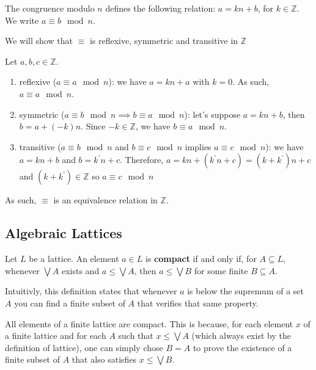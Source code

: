 \begin{example} The congruence modulo $n$ defines the following relation: $a =
  kn +b$, for $k \in \mathbb{Z}$. We write $a \equiv b \mod n$.

  We will show that $\equiv$ is reflexive, symmetric and transitive in
  $\mathbb{Z}$

  Let $a,b,c \in \mathbb{Z}$.
  \begin{enumerate}
  \item reflexive ($a \equiv a \mod n$): we have $a = kn + a$ with $k = 0$. As
    such, $a \equiv a \mod n$.
  \item symmetric ($a \equiv b \mod n \implies b \equiv a \mod n$): let's
    suppose $a = kn +b$, then $b = a + (-k)n$. Since $-k \in \mathbb{Z}$,
    we have $b \equiv a \mod n$.
  \item transitive ($a \equiv b \mod n$ and $b \equiv c \mod n$ implies
    $a \equiv c \mod n$): we have $a = kn + b$ and $b = k^{'} n + c$. Therefore,
    $a = kn + (k^{'} n + c) = (k + k^{'})n + c$ and $(k + k^{'}) \in \mathbb{Z}$
    so $a \equiv c \mod n$
  \end{enumerate}
  As such, $\equiv$ is an equivalence relation in $\mathbb{Z}$.
\end{example}

\subsection{Algebraic Lattices}

\begin{definition}
	Let $L$ be a lattice. An element $a \in L$ is \textbf{compact} if and only if, for $A \subseteq L$, whenever $\bigvee A$ exists and $a \leq \bigvee A$, then $a \leq \bigvee B$ for some finite $B \subseteq A$.
\end{definition}

\begin{remark}
	Intuitivly, this definition states that whenever $a$ is below the supremum of a set $A$ you can find a finite subset of $A$ that verifies that same property.
\end{remark}

 \begin{remark}
	 All elements of a finite lattice are compact. This is because, for each element $x$ of a finite lattice and for each $A$ such that $x \leq \bigvee A$ (which always exist by the definition of lattice), one can simply chose $B = A$ to prove the existence of a finite subset of $A$ that also satisfies $x \leq \bigvee B$.
 \end{remark}

